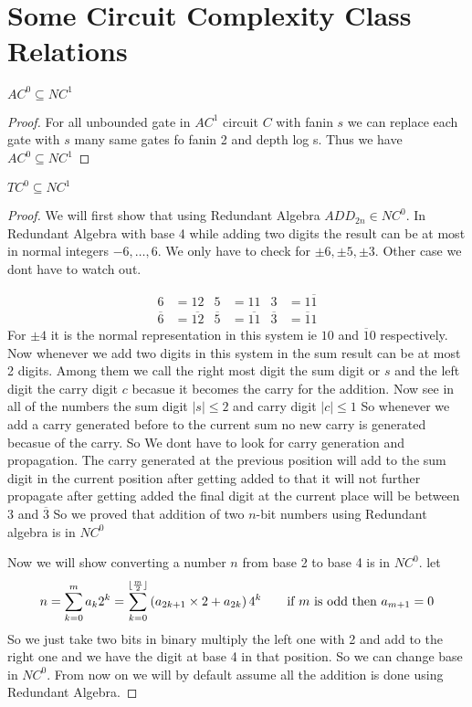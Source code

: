 \section{Some Circuit Complexity Class Relations}
\begin{theorem}
	$AC^0\subseteq NC^1$
\end{theorem}
\begin{proof}
	For all unbounded gate in $AC^1$ circuit $C$ with fanin $s$ we can replace each gate with $s$ many same gates fo fanin 2 and depth log s. Thus we have $AC^0\subseteq NC^1$
\end{proof}

\begin{theorem}
	$TC^0\subseteq NC^1$
\end{theorem}
\begin{proof}
	We will first show that using Redundant Algebra $ADD_{2n}\in NC^0$. In Redundant Algebra with base 4 while adding two digits the result can be at most in normal integers $-6,\dots, 6$. We only have to check for $\pm 6,\pm 5,\pm 3$. Other case we dont have to watch out. 
	
	\begin{align*}
		6&=12 & 5&=11 & 3&=1\overline{1}\\
		\overline{6}&=\overline{12} & \overline{5}&=\overline{11} & \overline{3}&=\overline{1}1
	\end{align*}
	For $\pm 4$ it is the normal representation in this system ie $10$ and $\overline{1}0$ respectively. Now whenever we add two digits in this system in the sum result can be at most 2 digits. Among them we call the right most digit the sum digit or $s$ and the left digit the carry digit $c$ becasue it becomes the carry for the addition. Now see in all of the numbers the sum digit $|s|\leq 2$ and carry digit $|c|\leq 1$ So whenever we add a carry generated before to the current sum no new carry is generated becasue of the carry. So We dont have to look for carry generation and propagation. The carry generated at the previous position will add to the sum digit in the current position after getting added to that it will not further propagate after getting added the final digit at the current place will be between $3$ and $\overline{3}$ So we proved that addition of two $n$-bit numbers using Redundant algebra is in $NC^0$
	
	Now we will show converting a number $n$ from base 2 to base 4 is in $NC^0$. let $$n=\sum_{k=0}^{m}a_k2^k=\sum_{k=0}^{\lfloor \frac{m}2\rfloor}\left(a_{2k+1}\times 2+a_{2k}\right)4^k\qquad \text{if }m\text{ is odd then } a_{m+1}=0$$ So we just take two bits in binary multiply the left one with 2 and add to the right one and we have the digit at base 4 in that position. So we can change base in $NC^0$. From now on we will by default assume all the addition is done using Redundant Algebra.
	

\end{proof}
